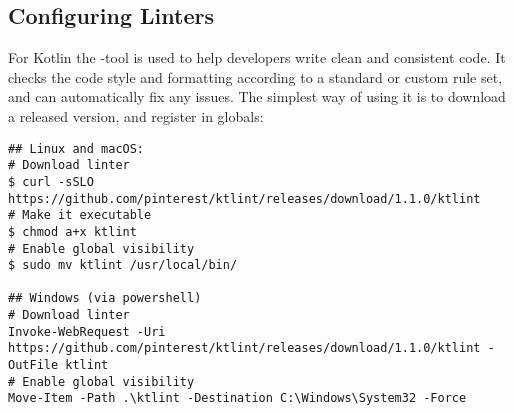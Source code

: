 
\subsection{Configuring Linters}

For Kotlin the -tool is used to help developers write clean and consistent code. It checks the code style and 
formatting according to a standard or custom rule set, and can automatically fix any issues. The simplest way of using 
it is to download a released version, and register in globals:

\begin{lstlisting}[language=terminal]
## Linux and macOS:
# Download linter
$ curl -sSLO https://github.com/pinterest/ktlint/releases/download/1.1.0/ktlint
# Make it executable
$ chmod a+x ktlint 
# Enable global visibility
$ sudo mv ktlint /usr/local/bin/

## Windows (via powershell)
# Download linter
Invoke-WebRequest -Uri https://github.com/pinterest/ktlint/releases/download/1.1.0/ktlint -OutFile ktlint
# Enable global visibility
Move-Item -Path .\ktlint -Destination C:\Windows\System32 -Force
\end{lstlisting}


